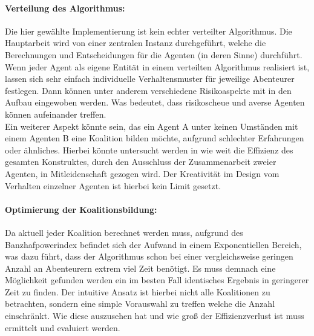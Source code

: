 \documentclass[fleqn,10pt]{SelfArx} %
\begin{document}
\paragraph{Verteilung des Algorithmus:}
Die hier gewählte Implementierung ist kein echter verteilter Algorithmus. Die Hauptarbeit wird von einer zentralen Instanz durchgeführt, welche die Berechnungen und Entscheidungen für die Agenten (in deren Sinne) durchführt. Wenn jeder Agent als eigene Entität in einem verteilten Algorithmus realisiert ist, lassen sich sehr einfach individuelle Verhaltensmuster für jeweilige Abenteurer festlegen. Dann können unter anderem verschiedene Risikoaspekte mit in den Aufbau eingewoben werden. Was bedeutet, dass risikoscheue und averse Agenten können aufeinander treffen. \\
Ein weiterer Aspekt könnte sein, das ein Agent A unter keinen Umständen mit einem Agenten B	eine Koalition bilden möchte, aufgrund schlechter Erfahrungen oder ähnliches. Hierbei könnte untersucht werden in wie weit die Effizienz des gesamten Konstruktes, durch den Ausschluss der Zusammenarbeit zweier Agenten, in Mitleidenschaft gezogen wird. Der Kreativität im Design vom Verhalten einzelner Agenten ist hierbei kein Limit gesetzt.

\paragraph{Optimierung der Koalitionsbildung:}
Da aktuell jeder Koalition berechnet werden muss, aufgrund des Banzhafpowerindex befindet sich der Aufwand in einem Exponentiellen Bereich, was dazu führt, dass der Algorithmus schon bei einer vergleichsweise geringen Anzahl an Abenteurern extrem viel Zeit benötigt. Es muss demnach eine Möglichkeit gefunden werden ein im besten Fall identisches Ergebnis in geringerer Zeit zu finden. Der intuitive Ansatz ist hierbei nicht alle Koalitionen zu betrachten, sondern eine simple Vorauswahl zu treffen welche die Anzahl einschränkt. Wie diese auszusehen hat und wie groß der Effizienzverlust ist muss ermittelt und evaluiert werden.
\end{document}
